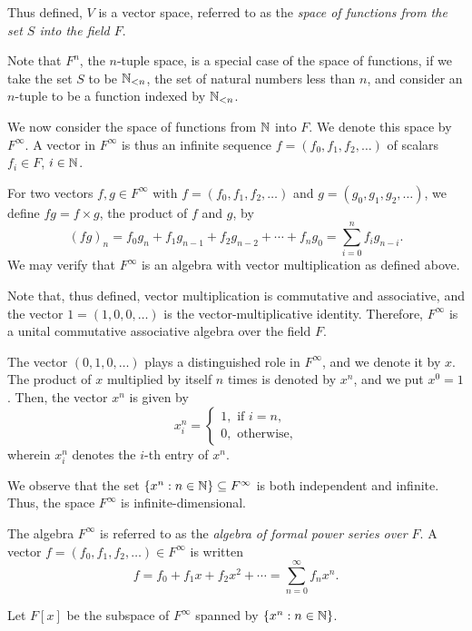   Thus defined, \(V\) is a vector space, referred to as the \emph{space of functions from the set \(S\) into the field
  \(F\)}.
\Exm

Note that \(F^n\), the \(n\)-tuple space, is a special case of the space of functions, if we take the set \(S\) to be
\(\mathbb{N}_{<n}\), the set of natural numbers less than \(n\), and consider an \(n\)-tuple to be a function indexed by \(\mathbb{N}_{<n}\).

We now consider the space of functions from \(\mathbb{N}\) into \(F\). We denote this space by \(F^\infty\). A vector in
\(F^\infty\) is thus an infinite sequence \(f = (f_0, f_1, f_2, \ldots)\) of scalars \(f_i \in F\), \(i \in \mathbb{N}\).

For two vectors \(f, g \in F^\infty\) with \(f = (f_0, f_1, f_2, \ldots)\) and \(g = (g_0, g_1, g_2, \ldots)\), we
define \(f g = f \times g\), the product of \(f\) and \(g\), by
\[
  (f g)_n = f_0 g_n + f_1 g_{n - 1} + f_2 g_{n - 2} + \cdots + f_n g_0 = \sum_{i = 0}^n f_i g_{n - i}.
\]
We may verify that \(F^\infty\) is an algebra with vector multiplication as defined above.

Note that, thus defined, vector multiplication is commutative and associative, and the vector \(1 = (1, 0, 0, \ldots)\)
is the vector-multiplicative identity. Therefore, \(F^\infty\) is a unital commutative associative algebra over the
field \(F\).

The vector \((0, 1, 0, \ldots)\) plays a distinguished role in \(F^\infty\), and we denote it by \(x\). The
product of \(x\) multiplied by itself \(n\) times is denoted by \(x^n\), and we put \(x^0 = 1\). Then, the vector
\(x^n\) is given by
\[
  x^n_i = \begin{cases}
    1, \text{ if } i = n,\\
    0, \text{ otherwise,}
  \end{cases}
\]
wherein \(x^n_i\) denotes the \(i\)-th entry of \(x^n\).

We observe that the set \(\{x^n : n \in \mathbb{N}\} \subseteq F^\infty\) is both independent and infinite. Thus, the
space \(F^\infty\) is infinite-dimensional.

The algebra \(F^\infty\) is referred to as the \emph{algebra of formal power series over \(F\)}. A vector \(f = (f_0,
f_1, f_2, \ldots) \in F^\infty\) is written
\[
  f = f_0 + f_1 x + f_2 x^2 + \cdots = \sum_{n = 0}^\infty f_n x^n.
\]

\Bdf
  Let \(F[x]\) be the subspace of \(F^\infty\) spanned by \(\{x^n : n \in \mathbb{N}\}\).

